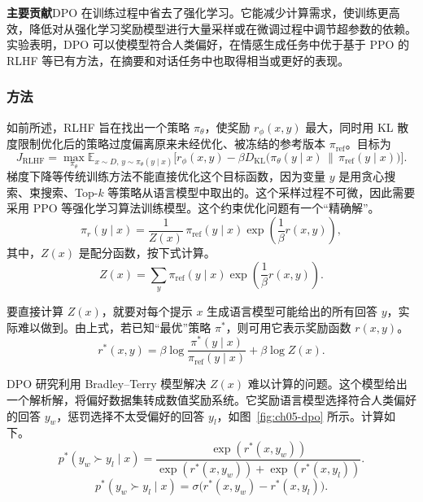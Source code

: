 \begin{keypoint}
\noindent\textbf{主要贡献}\quad DPO 在训练过程中省去了强化学习。它能减少计算需求，使训练更高效，降低对从强化学习奖励模型进行大量采样或在微调过程中调节超参数的依赖。实验表明，DPO 可以使模型符合人类偏好，在情感生成任务中优于基于 PPO 的 RLHF 等已有方法，在摘要和对话任务中也取得相当或更好的表现。
\end{keypoint}

\subsubsection{方法}
如前所述，RLHF 旨在找出一个策略 $\pi_\theta$，使奖励 $r_\phi(x,y)$ 最大，同时用 KL 散度限制优化后的策略过度偏离原来未经优化、被冻结的参考版本 $\pi_{\mathrm{ref}}$。目标为
\begin{equation}
J_{\mathrm{RLHF}}
=\max_{\pi_\theta}\mathbb{E}_{x\sim D,\,y\sim\pi_\theta(y\mid x)}
\bigl[
r_\phi(x,y)-\beta D_{\mathrm{KL}}\bigl(\pi_\theta(y\mid x)\,\|\,\pi_{\mathrm{ref}}(y\mid x)\bigr)
\bigr].
\label{eq:ch05-rlhf-objective}
\end{equation}
梯度下降等传统训练方法不能直接优化这个目标函数，因为变量 $y$ 是用贪心搜索、束搜索、Top-$k$ 等策略从语言模型中取出的。这个采样过程不可微，因此需要采用 PPO 等强化学习算法训练模型。这个约束优化问题有一个“精确解”。
\begin{equation}
\pi_r(y\mid x)=\frac{1}{Z(x)}\,\pi_{\mathrm{ref}}(y\mid x)
  \exp\!\left(\frac{1}{\beta}r(x,y)\right),
\label{eq:ch05-dpo-optimal-policy}
\end{equation}
其中，$Z(x)$ 是配分函数，按下式计算。
\[
Z(x)=\sum_y \pi_{\mathrm{ref}}(y\mid x)\exp\!\left(\frac{1}{\beta}r(x,y)\right).
\]

要直接计算 $Z(x)$，就要对每个提示 $x$ 生成语言模型可能给出的所有回答 $y$，实际难以做到。由上式，若已知“最优”策略 $\pi^*$，则可用它表示奖励函数 $r(x,y)$。
\begin{equation}
r^*(x,y)=\beta\log\frac{\pi^*(y\mid x)}{\pi_{\mathrm{ref}}(y\mid x)}
+\beta\log Z(x).
\label{eq:ch05-dpo-optimal-reward}
\end{equation}

DPO 研究利用 Bradley–Terry 模型解决 $Z(x)$ 难以计算的问题。这个模型给出一个解析解，将偏好数据集转成数值奖励系统。它奖励语言模型选择符合人类偏好的回答 $y_w$，惩罚选择不太受偏好的回答 $y_l$，如图~\ref{fig:ch05-dpo} 所示。计算如下。
\begin{equation}
p^*(y_w\succ y_l\mid x)
=\frac{\exp(r^*(x,y_w))}{\exp(r^*(x,y_w))+\exp(r^*(x,y_l))}.
\label{eq:ch05-dpo-bt}
\end{equation}
\begin{equation}
p^*(y_w\succ y_l\mid x)
=\sigma\bigl(r^*(x,y_w)-r^*(x,y_l)\bigr).
\label{eq:ch05-dpo-logistic}
\end{equation}

